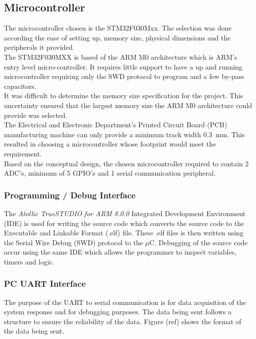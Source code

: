 \subsection{Microcontroller}
The microcontroller chosen is the STM32F030Mxx. The selection was done according the ease of setting up, memory size, physical dimensions and the peripherals it provided.\\

The STM32F030MXX is based of the ARM M0 architecture which is ARM's entry level micro-controller. It requires little support to have a up and running microcontroller requiring only the SWD protocol to program and a few by-pass capacitors.\\

It was difficult to determine the memory size specification for the project. This uncertainty ensured that the largest memory size the ARM M0 architecture could provide was selected.\\

The Electrical and Electronic Department's Printed Circuit Board (PCB) manufacturing machine can only provide a  minimum track width \SI{0.3}{mm}. This resulted in choosing a microcontroller whose footprint would meet the requirement.\\

Based on the conceptual design, the chosen microcontroller required to contain 2 ADC's, minimum of 5 GPIO's and 1 serial communication peripheral.

\subsubsection{Programming / Debug Interface}
The \textit{Atollic TrueSTUDIO for ARM 8.0.0} Integrated Development Environment (IDE) is used for writing the source code which converts the source code to the Executable and Linkable Format (.elf) file. These .elf files is then written using the Serial Wire Debug (SWD) protocol to the $\mu$C. Debugging of the source code occur using the same IDE which allows the programmer to inspect variables, timers and logic.

\subsubsection{PC UART Interface }

The purpose of the UART to serial communication is for data acquisition of the system response and for debugging purposes. The data being sent follows a structure to ensure the reliability of the data. Figure (ref) shows the format of the data being sent.

